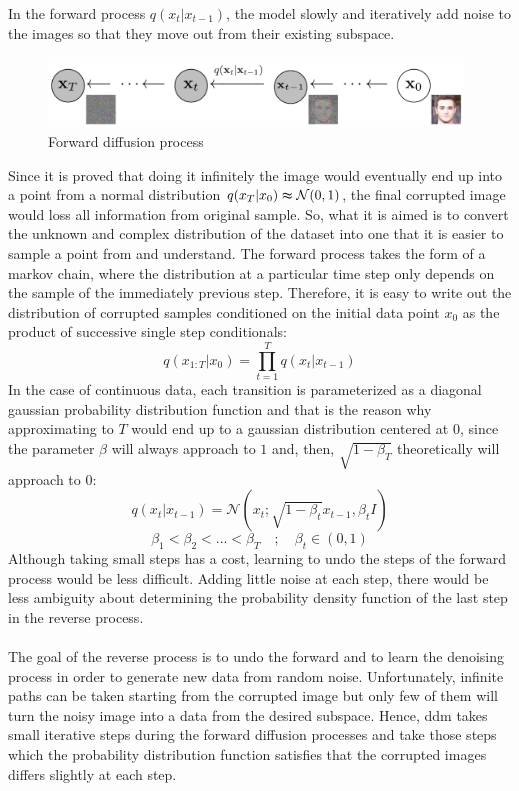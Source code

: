 \documentclass[11pt, a4paper]{article}
\begin{document}
	In the forward process $q(x_{t}|x_{t-1})$, the model slowly and iteratively add noise to the images so that they move out from their existing subspace. 
	\begin{figure}[H]
		\centering
		\includegraphics[width=11cm]{imgs/relatedwork/forward-diffusion}
		\caption{Forward diffusion process}
		\label{fig:related-forward-diffusion}
	\end{figure}
	Since it is proved that doing it infinitely the image would eventually end up into a point from a normal distribution $q(x_T|x_0) \thickapprox \mathcal{N}(0,1) $, the final corrupted image would loss all information from original sample. So, what it is aimed is to convert the unknown and complex distribution of the dataset into one that it is easier to sample a point from and understand. The forward process takes the form of a markov chain, where the distribution at a particular time step only depends on the sample of the immediately previous step. Therefore, it is easy to write out the distribution of corrupted samples conditioned on the initial data point $x_0$ as the product of successive single step conditionals:
	\[q(x_{1:T} | x_0) = \prod_{t=1}^{T} q(x_t|x_{t-1})\]
	In the case of continuous data, each transition is parameterized as a diagonal gaussian probability distribution function and that is the reason why approximating to $T$ would end up to a gaussian distribution centered at 0, since the parameter $\beta$ will always approach to $1$ and, then, $\sqrt{1 - \beta_T}$ theoretically will approach to 0:
	\[q(x_{t}|x_{t-1}) = \mathcal{N}(x_t; \sqrt{1 - \beta_t} x_{t-1}, \beta_t I)\]
	\[ \beta_1 < \beta_2 < ... < \beta_T \quad ; \quad \beta_t \in (0,1) \]
	Although taking small steps has a cost, learning to undo the steps of the forward process would be less difficult. Adding little noise at each step, there would be less ambiguity about determining the probability density function of the last step in the reverse process.
	\\	%
	\\
	The goal of the reverse process is to undo the forward and to learn the denoising process in order to generate new data from random noise. Unfortunately, infinite paths can be taken starting from the corrupted image but only few of them will turn the noisy image into a data from the desired subspace. Hence, \gls{ddm} takes small iterative steps during the forward diffusion processes and take those steps which the probability distribution function satisfies that the corrupted images differs slightly at each step.
\end{document}
